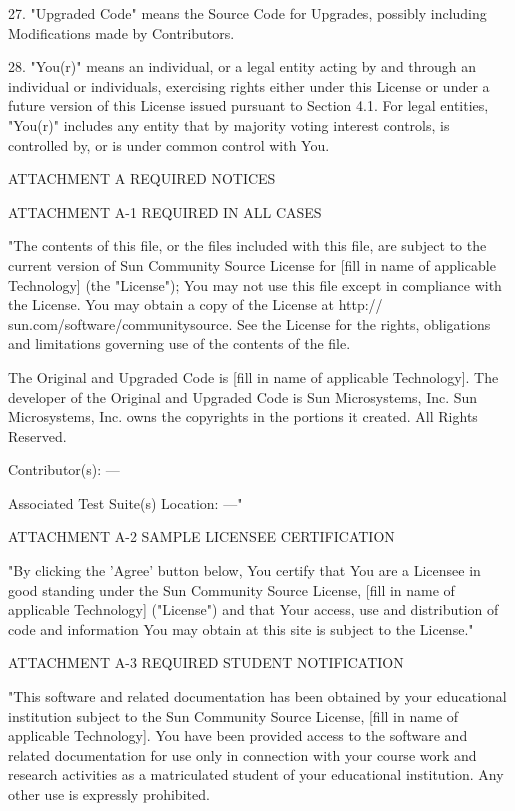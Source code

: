 {27.  "Upgraded Code" means the Source Code for Upgrades, possibly
including Modifications made by Contributors.

28.  "You(r)" means an individual, or a legal entity acting by and
through an individual or individuals, exercising rights either under
this License or under a future version of this License issued pursuant
to Section 4.1.  For legal entities, "You(r)" includes any entity that
by majority voting interest controls, is controlled by, or is under
common control with You.

ATTACHMENT A REQUIRED NOTICES

ATTACHMENT A-1 REQUIRED IN ALL CASES

"The contents of this file, or the files included with this file, are
subject to the current version of Sun Community Source License for
[fill in name of applicable Technology] (the "License"); You may not
use this file except in compliance with the License.  You may obtain a
copy of the License at http:// sun.com/software/communitysource.  See
the License for the rights, obligations and limitations governing use
of the contents of the file.

The Original and Upgraded Code is [fill in name of applicable
Technology].  The developer of the Original and Upgraded Code is Sun
Microsystems, Inc.  Sun Microsystems, Inc.  owns the copyrights in the
portions it created.  All Rights Reserved.

Contributor(s): ---

Associated Test Suite(s) Location: ---"

ATTACHMENT A-2 SAMPLE LICENSEE CERTIFICATION

"By clicking the 'Agree' button below, You certify that You are a
Licensee in good standing under the Sun Community Source License,
[fill in name of applicable Technology] ("License") and that Your
access, use and distribution of code and information You may obtain at
this site is subject to the License."

ATTACHMENT A-3 REQUIRED STUDENT NOTIFICATION

"This software and related documentation has been obtained by your
educational institution subject to the Sun Community Source License,
[fill in name of applicable Technology].  You have been provided
access to the software and related documentation for use only in
connection with your course work and research activities as a
matriculated student of your educational institution.  Any other use
is expressly prohibited.

}
